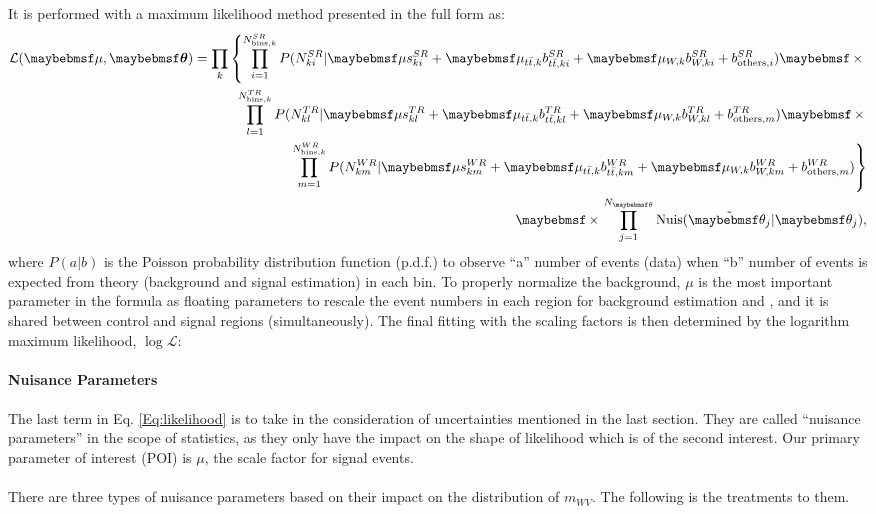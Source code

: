 \noindent
It is performed with a maximum likelihood method presented in the full form as:
 \begin{eqnarray}
 \label{Eq. ML_all}
 \mathcal{L}(\mu, \mbox{\boldmath $\theta$}) = \displaystyle\prod_{k} \left\{
 \displaystyle\prod_{i=1}^{N_{{\rm bins},k}^{SR}}P(N_{ki}^{SR}|\mu s_{ki}^{SR} + \mu_{t\bar{t},k} b_{t\bar{t},ki}^{SR} + \mu_{W,k} b_{W,ki}^{SR} + b_{{\rm others},i}^{SR})
 \times \right. \nonumber \\
 \displaystyle\prod_{l=1}^{N_{{\rm bins},k}^{TR}}P(N_{kl}^{TR}|\mu s_{kl}^{TR} + \mu_{t\bar{t},k} b_{t\bar{t},kl}^{TR} + \mu_{W,k} b_{W,kl}^{TR} + b_{{\rm others},m}^{TR})
 \times \nonumber \\
 \left. \displaystyle\prod_{m=1}^{N_{{\rm bins},k}^{WR}}P(N_{km}^{WR}|\mu s_{km}^{WR} + \mu_{t\bar{t},k} b_{t\bar{t},km}^{WR} + \mu_{W,k} b_{W,km}^{WR} + b_{{\rm others},m}^{WR})
 \right\} \nonumber \\
 \times\displaystyle\prod_{j=1}^{N_{\theta}}{\rm Nuis}(\tilde{\theta_j}|\theta_j),
 \label{Eq:likelihood}
 \end{eqnarray}
where $P(a|b)$ is the Poisson probability distribution function (p.d.f.) to observe ``a'' number of events (data) when ``b'' number of events is expected from theory (background and signal estimation) in each bin. To properly normalize the background, $\mu$ is the most important parameter in the formula as floating parameters to rescale the event numbers in each region for background estimation and , and it is shared between control and signal regions (simultaneously). The final fitting with the scaling factors is then determined by the logarithm maximum likelihood, $\log{\mathcal{L}}$:
\\
\\{\bf Nuisance Parameters}
\\
\\The last term in Eq. \ref{Eq:likelihood} is to take in the consideration of uncertainties mentioned in the last section. They are called ``nuisance parameters'' in the scope of statistics, as they only have the impact on the shape of likelihood which is of the second interest. Our primary parameter of interest (POI) is $\mu$, the scale factor for signal events.
\\
\\There are three types of nuisance parameters based on their impact on the distribution of $m_{WV}$. The following is the treatments to them.
